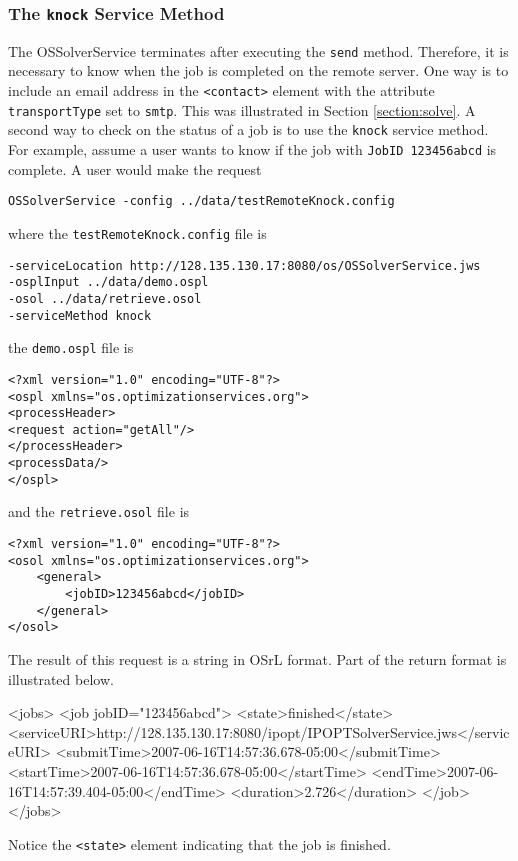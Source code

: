 \documentclass[11pt]{article}
\renewcommand{\_}{{\char"5F}}
\renewcommand{\{}{{\char"7B}}
\renewcommand{\}}{{\char"7D}}
\renewcommand{\^}{{\char"0D}}
\renewcommand{\'}{{\char"0D}}
\begin{document}
\subsubsection{The  {\tt knock} Service Method}\label{section:knock}

The OSSolverService terminates after executing the {\tt send} method. Therefore, it is necessary to know when the job is completed on the remote server. One way is to include an email address in the  {\tt <contact>}  element with the attribute {\tt transportType}     set to {\tt smtp}.  This was illustrated in Section \ref{section:solve}.  A second way to check on the status of a job is to use the {\tt knock} service method.  For example, assume a user   wants to know if  the job with {\tt JobID 123456abcd}  is complete. A user would make the request
\begin{verbatim}
OSSolverService -config ../data/testRemoteKnock.config
\end{verbatim}
where the {\tt testRemoteKnock.config} file is
\begin{verbatim}
-serviceLocation http://128.135.130.17:8080/os/OSSolverService.jws
-osplInput ../data/demo.ospl
-osol ../data/retrieve.osol
-serviceMethod knock
\end{verbatim}
the {\tt demo.ospl} file is
\begin{verbatim}
<?xml version="1.0" encoding="UTF-8"?>
<ospl xmlns="os.optimizationservices.org">
<processHeader>
<request action="getAll"/>
</processHeader>
<processData/>
</ospl>
\end{verbatim}
and the {\tt retrieve.osol} file is
\begin{verbatim}
<?xml version="1.0" encoding="UTF-8"?>
<osol xmlns="os.optimizationservices.org">
 	<general>         
 		<jobID>123456abcd</jobID>  
	</general>
</osol>
\end{verbatim}
The result of this request is a string in OSrL format.  Part of the return format is illustrated below.
\begin{verbatimtab}[4]
<jobs>
	<job jobID="123456abcd">
		<state>finished</state>
		<serviceURI>http://128.135.130.17:8080/ipopt/IPOPTSolverService.jws</serviceURI>
		<submitTime>2007-06-16T14:57:36.678-05:00</submitTime>
		<startTime>2007-06-16T14:57:36.678-05:00</startTime>
		<endTime>2007-06-16T14:57:39.404-05:00</endTime>
		<duration>2.726</duration>
 </job>
</jobs>
\end{verbatimtab}
Notice the {\tt <state>} element indicating that the job is finished.   
\end{document}
